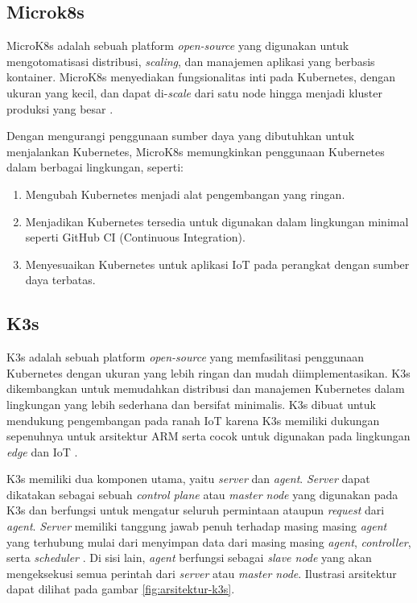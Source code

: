 \subsection{Microk8s}
MicroK8s adalah sebuah platform \textit{open-source} yang digunakan untuk mengotomatisasi distribusi, \textit{scaling}, dan manajemen aplikasi yang berbasis kontainer. MicroK8s menyediakan fungsionalitas inti pada Kubernetes, dengan ukuran yang kecil, dan dapat di-\textit{scale} dari satu node hingga menjadi kluster produksi yang besar \parencite{microk8s}.

Dengan mengurangi penggunaan sumber daya yang dibutuhkan untuk menjalankan Kubernetes, MicroK8s memungkinkan penggunaan Kubernetes dalam berbagai lingkungan, seperti:

\begin{enumerate}
  \item Mengubah Kubernetes menjadi alat pengembangan yang ringan.
  \item Menjadikan Kubernetes tersedia untuk digunakan dalam lingkungan minimal seperti GitHub CI (Continuous Integration).
  \item Menyesuaikan Kubernetes untuk aplikasi IoT pada perangkat dengan sumber daya terbatas.
\end{enumerate}


\subsection{K3s}
K3s adalah sebuah platform \textit{open-source} yang memfasilitasi penggunaan Kubernetes dengan ukuran yang lebih ringan dan mudah diimplementasikan. K3s dikembangkan untuk memudahkan distribusi dan manajemen Kubernetes dalam lingkungan yang lebih sederhana dan bersifat minimalis. K3s dibuat untuk mendukung pengembangan pada ranah IoT karena K3s memiliki dukungan sepenuhnya untuk arsitektur ARM serta cocok untuk digunakan pada lingkungan \textit{edge} dan IoT \parencite{k3s}.

K3s memiliki dua komponen utama, yaitu \textit{server} dan \textit{agent}. \textit{Server} dapat dikatakan sebagai sebuah \textit{control plane} atau \textit{master node} yang digunakan pada K3s dan berfungsi untuk mengatur seluruh permintaan ataupun \textit{request} dari \textit{agent}. \textit{Server} memiliki tanggung jawab penuh terhadap masing masing \textit{agent} yang terhubung mulai dari menyimpan data dari masing masing \textit{agent}, \textit{controller}, serta \textit{scheduler} \parencite{k3s}. Di sisi lain, \textit{agent} berfungsi sebagai \textit{slave node} yang akan mengeksekusi semua perintah dari \textit{server} atau \textit{master node}. Ilustrasi arsitektur dapat dilihat pada gambar \ref{fig:arsitektur-k3s}.

